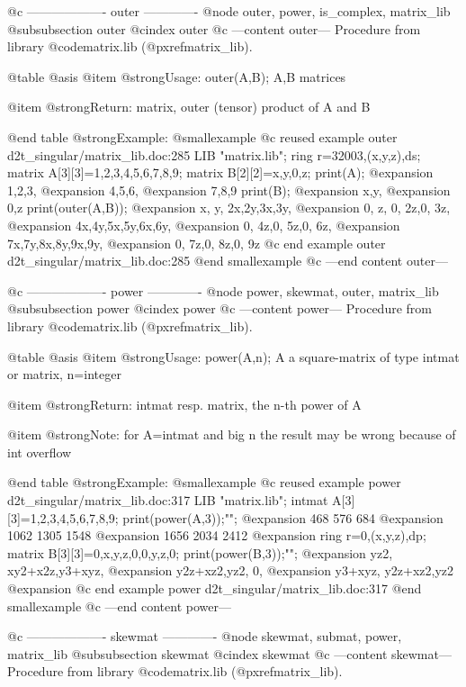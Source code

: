 @c ------------------- outer -------------
@node outer, power, is_complex, matrix_lib
@subsubsection outer
@cindex outer
@c ---content outer---
Procedure from library @code{matrix.lib} (@pxref{matrix_lib}).

@table @asis
@item @strong{Usage:}
outer(A,B); A,B matrices

@item @strong{Return:}
matrix, outer (tensor) product of A and B

@end table
@strong{Example:}
@smallexample
@c reused example outer d2t_singular/matrix_lib.doc:285 
LIB "matrix.lib";
ring r=32003,(x,y,z),ds;
matrix A[3][3]=1,2,3,4,5,6,7,8,9;
matrix B[2][2]=x,y,0,z;
print(A);
@expansion{} 1,2,3,
@expansion{} 4,5,6,
@expansion{} 7,8,9 
print(B);
@expansion{} x,y,
@expansion{} 0,z 
print(outer(A,B));
@expansion{} x, y, 2x,2y,3x,3y,
@expansion{} 0, z, 0, 2z,0, 3z,
@expansion{} 4x,4y,5x,5y,6x,6y,
@expansion{} 0, 4z,0, 5z,0, 6z,
@expansion{} 7x,7y,8x,8y,9x,9y,
@expansion{} 0, 7z,0, 8z,0, 9z 
@c end example outer d2t_singular/matrix_lib.doc:285
@end smallexample
@c ---end content outer---

@c ------------------- power -------------
@node power, skewmat, outer, matrix_lib
@subsubsection power
@cindex power
@c ---content power---
Procedure from library @code{matrix.lib} (@pxref{matrix_lib}).

@table @asis
@item @strong{Usage:}
power(A,n); A a square-matrix of type intmat or matrix, n=integer

@item @strong{Return:}
intmat resp. matrix, the n-th power of A

@item @strong{Note:}
for A=intmat and big n the result may be wrong because of int overflow

@end table
@strong{Example:}
@smallexample
@c reused example power d2t_singular/matrix_lib.doc:317 
LIB "matrix.lib";
intmat A[3][3]=1,2,3,4,5,6,7,8,9;
print(power(A,3));"";
@expansion{}    468   576   684
@expansion{}   1062  1305  1548
@expansion{}   1656  2034  2412
@expansion{} 
ring r=0,(x,y,z),dp;
matrix B[3][3]=0,x,y,z,0,0,y,z,0;
print(power(B,3));"";
@expansion{} yz2,    xy2+x2z,y3+xyz,
@expansion{} y2z+xz2,yz2,    0,     
@expansion{} y3+xyz, y2z+xz2,yz2    
@expansion{} 
@c end example power d2t_singular/matrix_lib.doc:317
@end smallexample
@c ---end content power---

@c ------------------- skewmat -------------
@node skewmat, submat, power, matrix_lib
@subsubsection skewmat
@cindex skewmat
@c ---content skewmat---
Procedure from library @code{matrix.lib} (@pxref{matrix_lib}).

